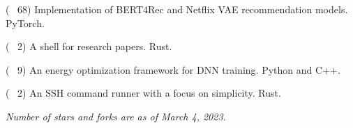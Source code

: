 
\begin{cvlist}

  \cvlistitem
  {\href{https://github.com/jaywonchung/BERT4Rec-VAE-Pytorch}{} {\normalfont ( \faCodeFork~68)}} %
    {Implementation of BERT4Rec and Netflix VAE recommendation models. PyTorch.} %

  \cvlistitem
    {\href{https://github.com/jaywonchung/reason}{} {\normalfont ( \faCodeFork~2)}} %
    {A shell for research papers. Rust.} %

  \cvlistitem
    {\href{https://github.com/SymbioticLab/Zeus}{} {\normalfont ( \faCodeFork~9)}} %
    {An energy optimization framework for DNN training. Python and C++.} %

  \cvlistitem
    {\href{https://github.com/jaywonchung/pegasus}{} {\normalfont ( \faCodeFork~2)}} %
    {An SSH command runner with a focus on simplicity. Rust.} %

\end{cvlist}

\vspace{-5mm}

\begin{cvparagraph}
\textit{Number of stars and forks are as of March 4, 2023.}
\end{cvparagraph}

